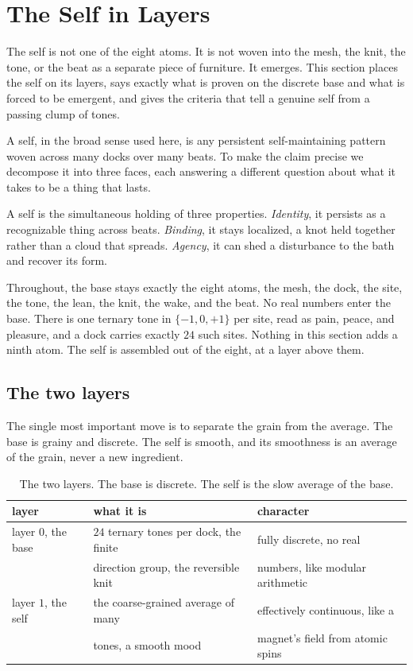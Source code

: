 \section{The Self in Layers}

The self is not one of the eight atoms. It is not woven into the mesh, the knit, the tone, or the beat as a separate piece of furniture. It emerges. This section places the self on its layers, says exactly what is proven on the discrete base and what is forced to be emergent, and gives the criteria that tell a genuine self from a passing clump of tones.

A self, in the broad sense used here, is any persistent self-maintaining pattern woven across many docks over many beats. To make the claim precise we decompose it into three faces, each answering a different question about what it takes to be a thing that lasts.

\begin{definition}
A self is the simultaneous holding of three properties.
\emph{Identity}, it persists as a recognizable thing across beats.
\emph{Binding}, it stays localized, a knot held together rather than a cloud that spreads.
\emph{Agency}, it can shed a disturbance to the bath and recover its form.
\end{definition}

Throughout, the base stays exactly the eight atoms, the mesh, the dock, the site, the tone, the lean, the knit, the wake, and the beat. No real numbers enter the base. There is one ternary tone in $\{-1, 0, +1\}$ per site, read as pain, peace, and pleasure, and a dock carries exactly $24$ such sites. Nothing in this section adds a ninth atom. The self is assembled out of the eight, at a layer above them.

\subsection{The two layers}

The single most important move is to separate the grain from the average. The base is grainy and discrete. The self is smooth, and its smoothness is an average of the grain, never a new ingredient.

\begin{table}[ht]
\centering
\begin{tabular}{@{}lll@{}}
\toprule
layer & what it is & character \\
\midrule
layer $0$, the base & $24$ ternary tones per dock, the finite & fully discrete, no real \\
 & direction group, the reversible knit & numbers, like modular arithmetic \\
layer $1$, the self & the coarse-grained average of many & effectively continuous, like a \\
 & tones, a smooth mood & magnet's field from atomic spins \\
\bottomrule
\end{tabular}
\caption{The two layers. The base is discrete. The self is the slow average of the base.}
\label{tab:two-layers}
\end{table}

